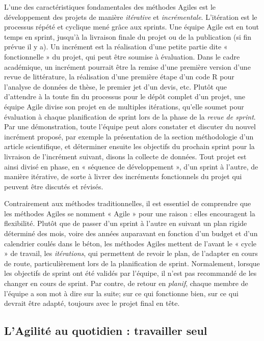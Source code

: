 \documentclass[
  letterpaper,
  DIV=11,
  numbers=noendperiod,
  oneside]{scrreprt}
\begin{document}
L'une des caractéristiques fondamentales des méthodes Agiles est le
développement des projets de manière \emph{itérative} et
\emph{incrémentale}. L'itération est le processus répété et cyclique
mené grâce aux sprints. Une équipe Agile est en tout temps en sprint,
jusqu'à la livraison finale du projet ou de la publication (si fin
prévue il y a). Un incrément est la réalisation d'une petite partie dite
« fonctionnelle » du projet, qui peut être soumise à évaluation. Dans le
cadre académique, un incrément pourrait être la remise d'une première
version d'une revue de littérature, la réalisation d'une première étape
d'un code R pour l'analyse de données de thèse, le premier jet d'un
devis, etc. Plutôt que d'attendre à la toute fin du processus pour le
dépôt complet d'un projet, une équipe Agile divise son projet en de
multiples itérations, qu'elle soumet pour évaluation à chaque
planification de sprint lors de la phase de la \emph{revue de sprint}.
Par une démonstration, toute l'équipe peut alors constater et discuter
du nouvel incrément proposé, par exemple la présentation de la section
méthodologie d'un article scientifique, et déterminer ensuite les
objectifs du prochain sprint pour la livraison de l'incrément suivant,
disons la collecte de données. Tout projet est ainsi divisé en phase, en
« séquence de développement », d'un sprint à l'autre, de manière
itérative, de sorte à livrer des incréments fonctionnels du projet qui
peuvent être discutés et révisés.

Contrairement aux méthodes traditionnelles, il est essentiel de
comprendre que les méthodes Agiles se nomment « Agile » pour une raison
: elles encouragent la flexibilité. Plutôt que de passer d'un sprint à
l'autre en suivant un plan rigide déterminé des mois, voire des années
auparavant en fonction d'un budget et d'un calendrier coulés dans le
béton, les méthodes Agiles mettent de l'avant le « cycle » de travail,
les \emph{itérations}, qui permettent de revoir le plan, de l'adapter en
cours de route, particulièrement lors de la planification de sprint.
Normalement, lorsque les objectifs de sprint ont été validés par
l'équipe, il n'est pas recommandé de les changer en cours de sprint. Par
contre, de retour en \emph{planif}, chaque membre de l'équipe a son mot
à dire sur la suite; sur ce qui fonctionne bien, sur ce qui devrait être
adapté, toujours avec le projet final en tête.

\hypertarget{lagilituxe9-au-quotidien-travailler-seul}{%
\subsection{L'Agilité au quotidien : travailler
seul}\label{lagilituxe9-au-quotidien-travailler-seul}}
\end{document}
